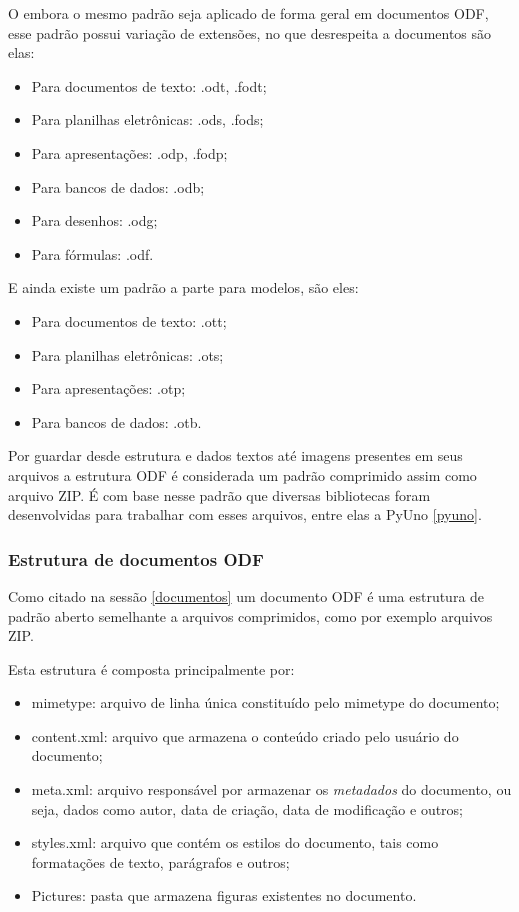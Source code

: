 O embora o mesmo padrão seja aplicado de forma geral em documentos ODF, esse padrão possui variação de extensões, no que desrespeita a documentos são elas:

\begin{itemize}
    \item{Para documentos de texto: .odt, .fodt;}
    \item{Para planilhas eletrônicas: .ods, .fods;}
    \item{Para apresentações: .odp, .fodp;}
    \item{Para bancos de dados: .odb;}
    \item{Para desenhos: .odg;}
    \item{Para fórmulas: .odf.}
\end{itemize}

E ainda existe um padrão a parte para modelos, são eles:

\begin{itemize}
    \item{Para documentos de texto: .ott;}
    \item{Para planilhas eletrônicas: .ots;}
    \item{Para apresentações: .otp;}
    \item{Para bancos de dados: .otb.}
\end{itemize}

Por guardar desde estrutura e dados textos até imagens presentes em seus arquivos a estrutura ODF é considerada um padrão comprimido assim como arquivo ZIP. É com base nesse padrão que diversas bibliotecas foram desenvolvidas para trabalhar com esses arquivos, entre elas a PyUno \ref{pyuno}.

\subsubsection{Estrutura de documentos ODF}

Como citado na sessão \ref{documentos} um documento ODF é uma estrutura de padrão aberto semelhante a arquivos comprimidos, como por exemplo arquivos ZIP.

Esta estrutura é composta principalmente por:

\begin{itemize}
    \item{mimetype: arquivo de linha única constituído pelo mimetype do documento;}
    \item{content.xml: arquivo que armazena o conteúdo criado pelo usuário do documento;}
    \item{meta.xml: arquivo responsável por armazenar os \textit{metadados} do documento, ou seja, dados como autor, data de criação, data de modificação e outros;}
    \item{styles.xml: arquivo que contém os estilos do documento, tais como formatações de texto, parágrafos e outros;}
    \item{Pictures: pasta que armazena figuras existentes no documento.}
\end{itemize}

